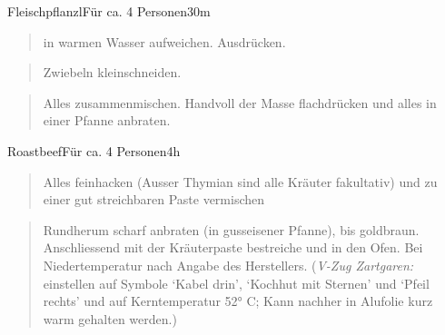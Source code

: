 \documentclass[
  a4paper,
]{article}
\begin{document}
\begin{recipe}{Fleischpflanzl}{Für ca. 4 Personen}{30m}


\begin{quote}
in warmen Wasser aufweichen. Ausdrücken.
\end{quote}

\freeform\hrulefill


\begin{quote}
Zwiebeln kleinschneiden.
\end{quote}

\freeform\hrulefill


\begin{quote}
Alles zusammenmischen. Handvoll der Masse flachdrücken und alles in
einer Pfanne anbraten.
\end{quote}

\freeform\hrulefill\newline{}\end{recipe}

\newpage

\begin{recipe}{Roastbeef}{Für ca. 4 Personen}{4h}


\begin{quote}
Alles feinhacken (Ausser Thymian sind alle Kräuter fakultativ) und zu
einer gut streichbaren Paste vermischen
\end{quote}

\freeform\hrulefill


\begin{quote}
Rundherum scharf anbraten (in gusseisener Pfanne), bis goldbraun.
Anschliessend mit der Kräuterpaste bestreiche und in den Ofen. Bei
Niedertemperatur nach Angabe des Herstellers. (\emph{V-Zug Zartgaren:}
einstellen auf Symbole `Kabel drin', `Kochhut mit Sternen' und `Pfeil
rechts' und auf Kerntemperatur 52° C; Kann nachher in Alufolie kurz warm
gehalten werden.)
\end{quote}

\freeform\hrulefill\newline\freeform{}\end{recipe}
\end{document}
